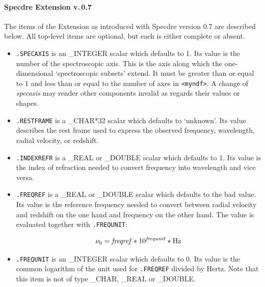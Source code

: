 \documentclass[11pt,twoside]{article}
\begin{document}

\paragraph{Specdre Extension v.\,0.7}

   The items of the Extension as introduced with Specdre version 0.7 are
   described below. All top-level items are optional, but each is either
   complete or absent.

\begin{itemize}

\item{\tt .SPECAXIS} is an \_INTEGER scalar which defaults to 1. Its
   value is the number of the spectroscopic axis. This is the axis along
   which the one-dimensional `spectroscopic subsets' extend. It must
   be greater than or equal to 1 and less than or equal to the number of
   axes in {\tt <myndf>}. A change of {\it specaxis} may render other
   components invalid as regards their values or shapes.

\item{\tt .RESTFRAME} is a \_CHAR*32 scalar which defaults to
   `unknown'.  Its value describes the rest frame used to express the
   observed frequency, wavelength, radial velocity, or redshift.

\item{\tt .INDEXREFR} is a \_REAL or \_DOUBLE scalar which defaults to
   1. Its value is the index of refraction needed to convert frequency
   into wavelength and vice versa.

\item{\tt .FREQREF} is a \_REAL or \_DOUBLE scalar which defaults to the
   bad value. Its value is the reference frequency needed to convert
   between radial velocity and redshift on the one hand and frequency on
   the other hand. The value is evaluated together with {\tt .FREQUNIT}:

   \[\nu_0={\it freqref}*10^{\it frequnit}*{\rm Hz}\]

\item{\tt .FREQUNIT} is an \_INTEGER scalar which defaults to 0. Its
   value is the common logarithm of the unit used for {\tt .FREQREF}
   divided by Hertz.  Note that this item is not of type \_CHAR, \_REAL
   or \_DOUBLE.


\end{itemize}
\end{document}

